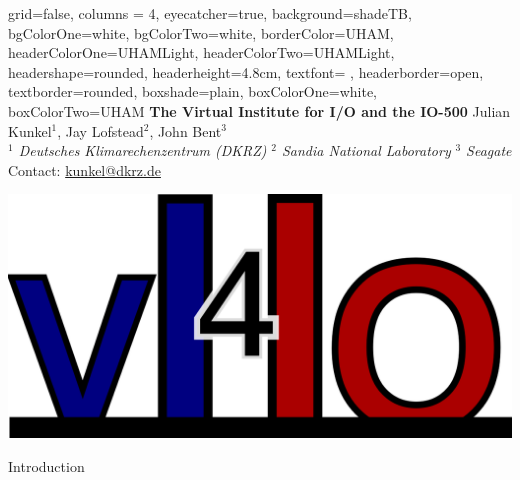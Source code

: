 \documentclass[portrait,a0paper,fontscale=0.4]{baposter}
\begin{document}



\begin{poster}
{ %
  grid=false,
  columns = 4,
  eyecatcher=true,
  background=shadeTB,%
  bgColorOne=white,
  bgColorTwo=white,
  borderColor=UHAM,
  headerColorOne=UHAMLight,
  headerColorTwo=UHAMLight,%
  headershape=rounded,
  headerheight=4.8cm,
  textfont={\setlength{\parindent}{0em} \setlength{\parskip}{0.75em}},
  headerborder=open,
  textborder=rounded,
  boxshade=plain,%
  boxColorOne=white,
  boxColorTwo=UHAM
}{ %
}{ %
  \textbf{The Virtual Institute for I/O and the IO-500}
}{ %
  \vspace{0.5em}
  \textsc
  Julian Kunkel$^1$, Jay Lofstead$^2$, John Bent$^3$
  \\[0.5em]
  \emph{$^1$ Deutsches Klimarechenzentrum (DKRZ)}
  \hspace*{2em}
  \emph{$^2$ Sandia National Laboratory}
   \hspace*{2em}
  \emph{$^3$ Seagate}
  \\[0.5em]
   Contact: \url{kunkel@dkrz.de}
}{
    \begin{minipage}{0.2\textwidth}
      \includegraphics[width=\textwidth]{logo-vi4io.png}
    \end{minipage}
}


\begin{posterbox}[name=problem,column=0]
{Introduction}


\end{posterbox}
\end{poster}
\end{document}
